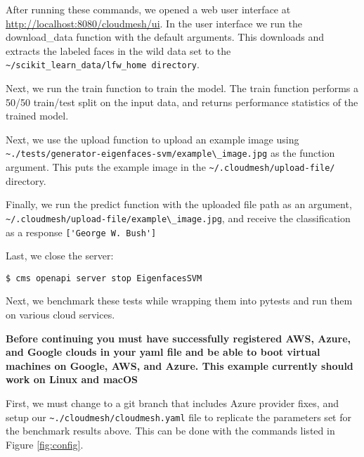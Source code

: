 After running these commands, we opened a web user interface at
\url{http://localhost:8080/cloudmesh/ui}. In the user interface we run
the download\_data function with the default arguments. This downloads
and extracts the labeled faces in the wild data set to the
\verb|~/scikit_learn_data/lfw_home directory|.

Next, we run the train function to train the model. The train function
performs a 50/50 train/test split on the input data, and returns
performance statistics of the trained model.

Next, we use the upload function to upload an example image using
\verb|~./tests/generator-eigenfaces-svm/example\_image.jpg|
as the function argument. This puts the example image in the
\verb|~/.cloudmesh/upload-file/| directory.

Finally, we run the predict function with the uploaded file path as an
argument,
\verb|~/.cloudmesh/upload-file/example\_image.jpg|,
and receive the classification as a response
\verb|['George W. Bush']|

Last, we close the server:

\begin{verbatim}
$ cms openapi server stop EigenfacesSVM
\end{verbatim}

Next, we benchmark these tests while wrapping them into pytests and run
them on various cloud services.

\textbf{Before continuing you must have successfully registered AWS,
Azure, and Google clouds in your yaml file and be able to boot virtual
machines on Google, AWS, and Azure. This example currently should work
on Linux and macOS}

First, we must change to a git branch that includes Azure provider
fixes, and setup our \verb|~./cloudmesh/cloudmesh.yaml| file to
replicate the parameters set for the benchmark results above. This can
be done with the commands listed in Figure \ref{fig:config}.


